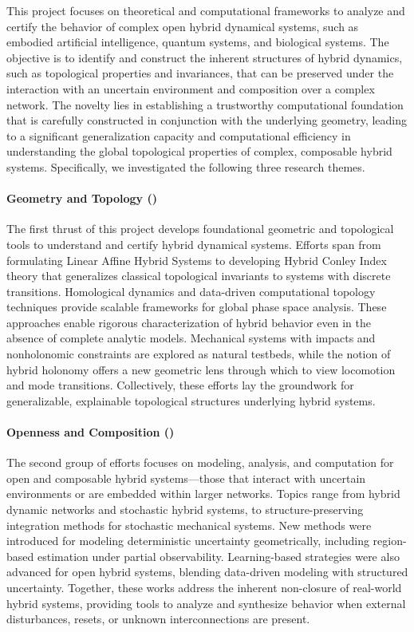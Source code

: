 \documentclass[letterpaper,11pt]{article}
\begin{document}
This project focuses on theoretical and computational frameworks to analyze and certify the behavior of complex open hybrid dynamical systems, such as embodied artificial intelligence,  quantum systems, and biological systems. 
The objective is to identify and construct the inherent structures of hybrid dynamics, such as topological properties and invariances, that can be preserved under the interaction with an uncertain environment and composition over a complex network.
The novelty lies in establishing a trustworthy computational foundation that is carefully constructed in conjunction with the underlying geometry, leading to a significant generalization capacity and computational efficiency in understanding the global topological properties of complex, composable hybrid systems. 
Specifically, we investigated the following three research themes.

\paragraph{Geometry and Topology ()}
The first thrust of this project develops foundational geometric and topological tools to understand and certify hybrid dynamical systems. 
Efforts span from formulating Linear Affine Hybrid Systems to developing Hybrid Conley Index theory that generalizes classical topological invariants to systems with discrete transitions. 
Homological dynamics and data-driven computational topology techniques provide scalable frameworks for global phase space analysis. 
These approaches enable rigorous characterization of hybrid behavior even in the absence of complete analytic models.
Mechanical systems with impacts and nonholonomic constraints are explored as natural testbeds, while the notion of hybrid holonomy offers a new geometric lens through which to view locomotion and mode transitions. 
Collectively, these efforts lay the groundwork for generalizable, explainable topological structures underlying hybrid systems.

\paragraph{Openness and Composition ()}
The second group of efforts focuses on modeling, analysis, and computation for open and composable hybrid systems—those that interact with uncertain environments or are embedded within larger networks. 
Topics range from hybrid dynamic networks and stochastic hybrid systems, to structure-preserving integration methods for stochastic mechanical systems. 
New methods were introduced for modeling deterministic uncertainty geometrically, including region-based estimation under partial observability. 
Learning-based strategies were also advanced for open hybrid systems, blending data-driven modeling with structured uncertainty. 
Together, these works address the inherent non-closure of real-world hybrid systems, providing tools to analyze and synthesize behavior when external disturbances, resets, or unknown interconnections are present.
\end{document}
